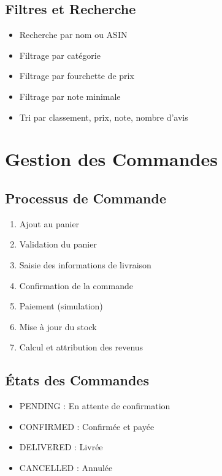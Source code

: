 \documentclass[12pt,a4paper]{report}
\begin{document}
\subsection{Filtres et Recherche}

\begin{itemize}[noitemsep]
    \item Recherche par nom ou ASIN
    \item Filtrage par catégorie
    \item Filtrage par fourchette de prix
    \item Filtrage par note minimale
    \item Tri par classement, prix, note, nombre d'avis
\end{itemize}

\section{Gestion des Commandes}

\subsection{Processus de Commande}

\begin{enumerate}[noitemsep]
    \item Ajout au panier
    \item Validation du panier
    \item Saisie des informations de livraison
    \item Confirmation de la commande
    \item Paiement (simulation)
    \item Mise à jour du stock
    \item Calcul et attribution des revenus
\end{enumerate}

\subsection{États des Commandes}

\begin{itemize}[noitemsep]
    \item PENDING : En attente de confirmation
    \item CONFIRMED : Confirmée et payée
    \item DELIVERED : Livrée
    \item CANCELLED : Annulée
\end{itemize}
\end{document}
